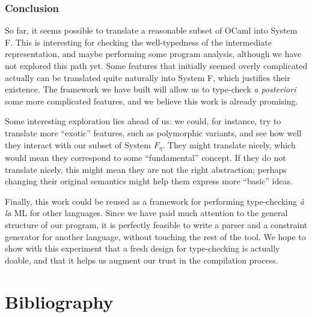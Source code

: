 \documentclass[10pt,a4paper,twoside,titlepage,twocolumn]{article}
\begin{document}
\section{Conclusion}

So far, it seems possible to translate a reasonable subset of OCaml into System
F. This is interesting for checking the well-typedness of the intermediate
representation, and maybe performing some program analysis, although we have not
explored this path yet. Some features that initially seemed overly complicated
actually can be translated quite naturally into System F, which justifies their
existence. The framework we have built will allow us to type-check \emph{a
posteriori} some more complicated features, and we believe this work is already
promising.

Some interesting exploration lies ahead of us: we could, for instance, try to
translate more ``exotic'' features, such as polymorphic variants, and see how
well they interact with our subset of System $F_\eta$. They might translate
nicely, which would mean they correspond to some ``fundamental'' concept. If
they do not translate nicely, this might mean they are not the right
abstraction; perhaps changing their original semantics might help them express
more ``basic'' ideas.

Finally, this work could be reused as a framework for performing type-checking
\emph{à la} ML for other languages. Since we have paid much attention to the
general structure of our program, it is perfectly feasible to write a parser and
a constraint generator for another language, without touching the rest of the
tool. We hope to show with this experiment that a fresh design for type-checking
is actually doable, and that it helps us augment our trust in the compilation
process.

\part{Bibliography}



\end{document}
